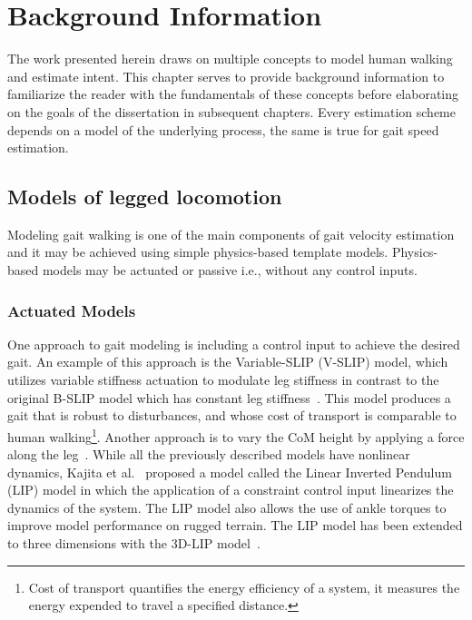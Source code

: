 \chapter{Background Information}\label{chapter:bg_info}

The work presented herein draws on multiple concepts to model human walking and estimate intent. This chapter serves to provide background information to familiarize the reader with the fundamentals of these concepts before elaborating on the goals of the dissertation in subsequent chapters. Every estimation scheme depends on a model of the underlying process, the same is true for gait speed estimation.

\section{Models of legged locomotion}

Modeling gait walking is one of the main components of gait velocity estimation and it may be achieved using simple physics-based template models. Physics-based models may be actuated or passive i.e., without any control inputs.  

\subsection{Actuated Models}

One approach to gait modeling is including a control input to achieve the desired gait. An example of this approach is the Variable-SLIP (V-SLIP) model, which utilizes variable stiffness actuation to modulate leg stiffness in contrast to the original B-SLIP model which has constant leg stiffness~\cite{visser2017bipedal}. This model produces a gait that is robust to disturbances, and whose cost of transport is comparable to human walking\footnote{Cost of transport quantifies the energy efficiency of a system, it measures the energy expended to travel a specified distance.}. Another approach is to vary the CoM height by applying a force along the leg~\cite{koolen2016balance}. While all the previously described models have nonlinear dynamics, Kajita et al.~\cite{kajita1991study} proposed a model called the Linear Inverted Pendulum (LIP) model in which the application of a constraint control input linearizes the dynamics of the system. The LIP model also allows the use of ankle torques to improve model performance on rugged terrain. The LIP model has been extended to three dimensions with the 3D-LIP model~\cite{kajita20013d}.

